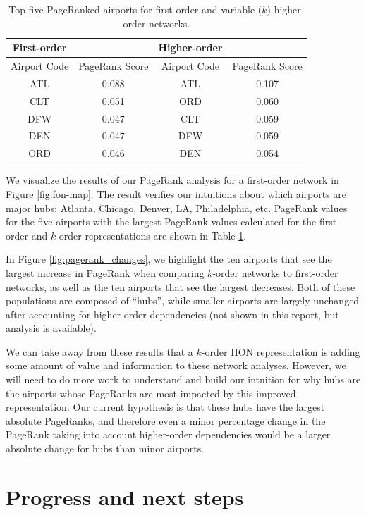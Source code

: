 \documentclass[sigconf]{acmart}
\begin{document}
\begin{table}[tb]
\begin{tabular}{c|c|c|c}
First-order  &                &   Higher-order &                \\
\hline
Airport Code & PageRank Score &   Airport Code & PageRank Score \\
\hline
ATL          & 0.088  &   ATL          & 0.107   \\
CLT          & 0.051  &   ORD          & 0.060  \\
DFW          & 0.047  &   CLT          & 0.059  \\
DEN          & 0.047   &   DFW         & 0.059  \\
ORD          & 0.046  &   DEN          & 0.054
\end{tabular}
\caption{Top five PageRanked airports for first-order and variable ($k$) higher-order networks.}
\label{tab:pagerank}
\end{table}

We visualize the results of our PageRank analysis for a first-order network in Figure \ref{fig:fon-map}. The result verifies our intuitions about which airports are major hubs: Atlanta, Chicago, Denver, LA, Philadelphia, etc. PageRank values for the five airports with the largest PageRank values calculated for the first-order and $k$-order representations are shown in Table \ref{tab:pagerank}.

In Figure \ref{fig:pagerank_changes}, we highlight the ten airports that see the largest increase in PageRank when comparing $k$-order networks to first-order networks, as well as the ten airports that see the largest decreases. Both of these populations are composed of ``hubs'', while smaller airports are largely unchanged after accounting for higher-order dependencies (not shown in this report, but analysis is available).

We can take away from these results that a $k$-order HON representation is adding some amount of value and information to these network analyses. However, we will need to do more work to understand and build our intuition for why hubs are the airports whose PageRanks are most impacted by this improved representation. Our current hypothesis is that these hubs have the largest absolute PageRanks, and therefore even a minor percentage change in the PageRank taking into account higher-order dependencies would be a larger absolute change for hubs than minor airports.

\section{Progress and next steps}
\end{document}
